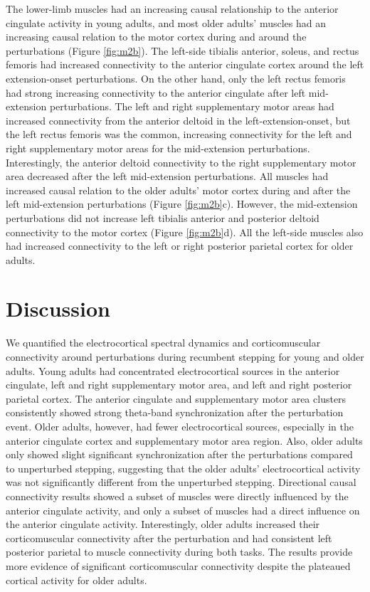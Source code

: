 \documentclass[../thesis_seyed.tex]{subfiles}
\begin{document}
The lower-limb muscles had an increasing causal relationship to the anterior cingulate activity in young adults, and most older adults’ muscles had an increasing causal relation to the motor cortex during and around the perturbations (Figure \ref{fig:m2b}). The left-side tibialis anterior, soleus, and rectus femoris had increased connectivity to the anterior cingulate cortex around the left extension-onset perturbations. On the other hand, only the left rectus femoris had strong increasing connectivity to the anterior cingulate after left mid-extension perturbations. The left and right supplementary motor areas had increased connectivity from the anterior deltoid in the left-extension-onset, but the left rectus femoris was the common, increasing connectivity for the left and right supplementary motor areas for the mid-extension perturbations. Interestingly, the anterior deltoid connectivity to the right supplementary motor area decreased after the left mid-extension perturbations. All muscles had increased causal relation to the older adults' motor cortex during and after the left mid-extension perturbations (Figure \ref{fig:m2b}c). However, the mid-extension perturbations did not increase left tibialis anterior and posterior deltoid connectivity to the motor cortex (Figure \ref{fig:m2b}d). All the left-side muscles also had increased connectivity to the left or right posterior parietal cortex for older adults.

\section{Discussion}
We quantified the electrocortical spectral dynamics and corticomuscular connectivity around perturbations during recumbent stepping for young and older adults. Young adults had concentrated electrocortical sources in the anterior cingulate, left and right supplementary motor area, and left and right posterior parietal cortex. The anterior cingulate and supplementary motor area clusters consistently showed strong theta-band synchronization after the perturbation event. Older adults, however, had fewer electrocortical sources, especially in the anterior cingulate cortex and supplementary motor area region. Also, older adults only showed slight significant synchronization after the perturbations compared to unperturbed stepping, suggesting that the older adults’ electrocortical activity was not significantly different from the unperturbed stepping. Directional causal connectivity results showed a subset of muscles were directly influenced by the anterior cingulate activity, and only a subset of muscles  had a direct influence on the anterior cingulate activity. Interestingly, older adults increased their corticomuscular connectivity after the perturbation and had consistent left posterior parietal to muscle connectivity during both tasks. The results  provide more evidence of significant corticomuscular connectivity despite the plateaued cortical activity for older adults.
\end{document}
